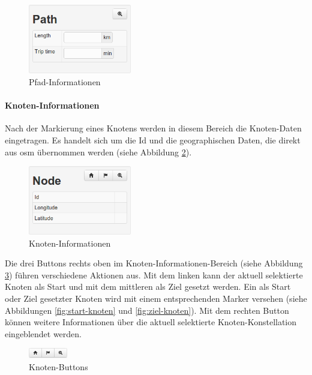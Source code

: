 \begin{figure}[htbp]
  \centering
  \includegraphics[width=0.4\textwidth]{Bilder/Pfad-Informationen.png}
  \caption{Pfad-Informationen}
  \label{fig:pfad-informationen}
\end{figure}

\paragraph{Knoten-Informationen}
\label{sec:knoten-informationen}

Nach der Markierung eines Knotens werden in diesem Bereich die Knoten-Daten eingetragen.
Es handelt sich um die Id und die geographischen Daten, die direkt aus \gls{osm} übernommen werden (siehe Abbildung \ref{fig:knoten-informationen}).

\begin{figure}[htbp]
  \centering
  \includegraphics[width=0.4\textwidth]{Bilder/Knoten-Informationen.png}
  \caption{Knoten-Informationen}
  \label{fig:knoten-informationen}
\end{figure}

Die drei Buttons rechts oben im Knoten-Informationen-Bereich (siehe Abbildung \ref{fig:knoten-buttons}) führen verschiedene Aktionen aus.
Mit dem linken kann der aktuell selektierte Knoten als Start und mit dem mittleren als Ziel gesetzt werden.
Ein als Start oder Ziel gesetzter Knoten wird mit einem entsprechenden Marker versehen (siehe Abbildungen \ref{fig:start-knoten} und \ref{fig:ziel-knoten}).
Mit dem rechten Button können weitere Informationen über die aktuell selektierte Knoten-Konstellation eingeblendet werden.

\begin{figure}[htbp]
  \centering
  \includegraphics[width=0.15\textwidth]{Bilder/Knoten-Buttons.png}
  \caption{Knoten-Buttons}
  \label{fig:knoten-buttons}
\end{figure}

